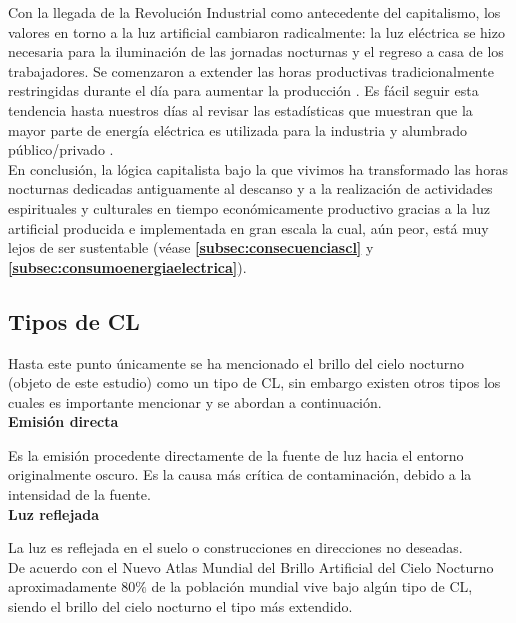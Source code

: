 Con la llegada de la Revolución Industrial como antecedente del capitalismo, los valores en torno a la luz artificial cambiaron radicalmente: la luz eléctrica se hizo necesaria para la iluminación de las jornadas nocturnas y el regreso a casa de los trabajadores. Se comenzaron a extender las horas productivas tradicionalmente restringidas durante el día para aumentar la producción \citep{Hudson1992}. Es fácil seguir esta tendencia hasta nuestros días al revisar las estadísticas que muestran que la mayor parte de energía eléctrica es utilizada para la industria y alumbrado público/privado \citep{Ramos2012}.\\ 


En conclusión, la lógica capitalista bajo la que vivimos ha transformado las horas nocturnas dedicadas antiguamente al descanso y a la realización de actividades espirituales y culturales en tiempo económicamente productivo gracias a la luz artificial producida e implementada en gran escala la cual, aún peor, está muy lejos de ser sustentable (véase \textbf{\autoref{subsec:consecuenciascl}} y \textbf{\autoref{subsec:consumoenergiaelectrica}}).

\newpage

\subsection{Tipos de CL} 

Hasta este punto únicamente se ha mencionado el brillo del cielo nocturno (objeto de este estudio) como un tipo de CL, sin embargo existen otros tipos \citep{LibroCL} los cuales es importante mencionar y se abordan a continuación.\\ 

\textbf{Emisión directa}

Es la emisión procedente directamente de la fuente de luz hacia el entorno originalmente oscuro. Es la causa más crítica de contaminación, debido a la intensidad de la fuente.\\ 

\textbf{Luz reflejada}

La luz es reflejada en el suelo o construcciones en direcciones no deseadas.\\ 


De acuerdo con el Nuevo Atlas Mundial del Brillo Artificial del Cielo Nocturno \citep{Falchi2016} aproximadamente 80$\%$ de la población mundial vive bajo algún tipo de CL, siendo el brillo del cielo nocturno el tipo más extendido.\\ 

